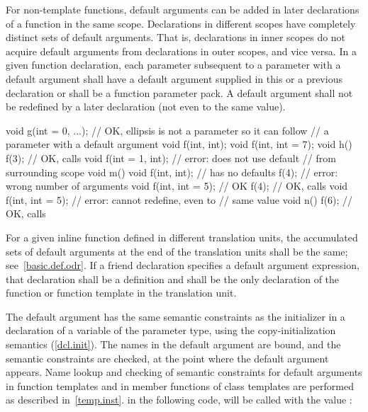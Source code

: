 \pnum
For non-template functions, default arguments can be added in later
declarations of a
function in the same scope.
Declarations in different
scopes have completely distinct sets of default arguments.
That
is, declarations in inner scopes do not acquire default
arguments from declarations in outer scopes, and vice versa.
In
a given function declaration, each parameter subsequent to a
parameter with a default argument shall have a default argument
supplied in this or a previous declaration
or shall be a function parameter pack.
A default argument
shall not be redefined by a later declaration (not even to the
same value).
\enterexample

\begin{codeblock}
void g(int = 0, ...);           // OK, ellipsis is not a parameter so it can follow
                                // a parameter with a default argument
void f(int, int);
void f(int, int = 7);
void h() {
  f(3);                         // OK, calls 
  void f(int = 1, int);         // error: does not use default
                                // from surrounding scope
}
void m() {
  void f(int, int);             // has no defaults
  f(4);                         // error: wrong number of arguments
  void f(int, int = 5);         // OK
  f(4);                         // OK, calls 
  void f(int, int = 5);         // error: cannot redefine, even to
                                // same value
}
void n() {
  f(6);                         // OK, calls 
}
\end{codeblock}
\exitexample
For a given inline function defined in different translation units,
the accumulated sets of default arguments at the end of the
translation units shall be the same;
see~\ref{basic.def.odr}.
If a friend declaration specifies a default argument expression,
that declaration shall be a definition and shall be the only
declaration of the function or function template in the translation unit.

\pnum
{}%
%
%
The default argument has the
same semantic constraints as the initializer in a
declaration of a variable of the parameter type, using the
copy-initialization semantics (\ref{dcl.init}).
The names in the
default argument are bound, and the semantic constraints are checked,
at the point where the default argument appears.
Name lookup and checking of semantic constraints for default
arguments in function templates and in member functions of
class templates are performed as described in~\ref{temp.inst}.
\enterexample
in the following code,
%
will be called with the value
:

